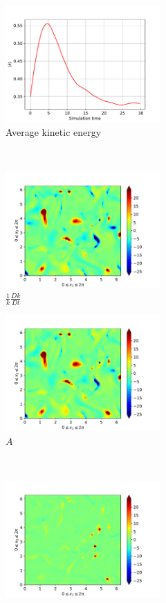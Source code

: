 \newpage

\begin{figure}[H]
    \begin{subfigure}[H]{0.45\textwidth}
        \includegraphics[height=1.75in]{media/run-cds-65/ke-average1330}
        \caption{Average kinetic energy}
    \end{subfigure}
    ~
    \begin{subfigure}[H]{0.45\textwidth}
        \includegraphics[height=1.75in]{media/run-cds-65/ke-1330}
        \caption{$\frac{1}{k} \frac{D k}{Dt}$}
    \end{subfigure}
    \newline
    \begin{subfigure}{0.45\textwidth}
        \includegraphics[height=1.75in]{media/run-cds-65/A-ke-1330}
        \caption{$A$}
    \end{subfigure}
    ~
    \begin{subfigure}{0.45\textwidth}
        \includegraphics[height=1.75in]{media/run-cds-65/C-ke-1330}

\end{subfigure}
\end{figure}
